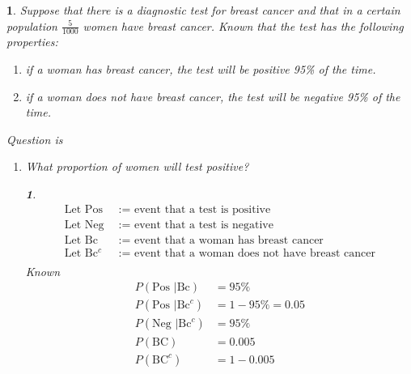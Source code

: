 \documentclass[11pt]{article}
\newtheorem*{solution}{\framebox{Sol}}
\newtheorem{example}{\framebox{Ex}}[section]
\newcommand\tab[1][1cm]{\hspace*{#1}}
\begin{document}
                \begin{example}
                    Suppose that there is a diagnostic test for breast cancer and that  in a certain population $\frac{5}{1000}$ women have breast cancer.
                    Known that the test has the following properties:
                    \begin{enumerate}
                        \item if a woman has breast cancer, the test will be positive 95\% of the time.
                        \item if a woman does not have breast cancer, the test will be negative 95\% of the time.
                    \end{enumerate}
                    Question is 
                    \begin{enumerate}
                        \item[i)] What proportion of women will test positive?
                            \begin{solution} \tab\\
                                \begin{align*}
                                    \text{Let Pos }&:=\text{ event that a test is positive } \\
                                    \text{Let Neg }&:=\text{ event that a test is negative } \\
                                    \text{Let Bc }&:=\text{ event that a woman has breast cancer} \\
                                    \text{Let Bc$^c$ }&:=\text{ event that a woman does not have breast cancer} \\
                                \end{align*}
                                Known
                                \begin{align*}
                                    P(\text{Pos } | \text{Bc})   &= 95\% \\
                                    P(\text{Pos } | \text{Bc}^c)   &= 1-95\%  = 0.05\\
                                    P(\text{Neg } | \text{Bc}^c) &= 95\% \\
                                    P(\text{BC})                 &= 0.005 \\
                                    P(\text{BC}^c)               &= 1-0.005\\
                                \end{align*}

\end{solution}
\end{enumerate}
\end{example}
\end{document}
